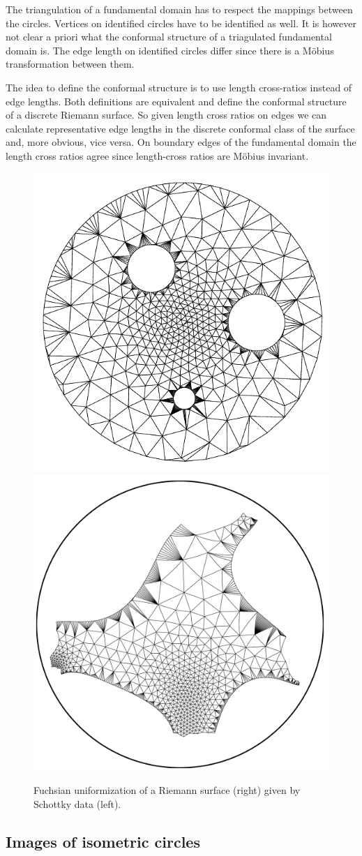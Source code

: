 The triangulation of a fundamental domain has to respect the mappings between the circles. Vertices on identified 
circles have to be identified as well. It is however not clear a priori what the conformal structure of a triagulated 
fundamental domain is. The edge length on identified circles differ since there is a M{\" o}bius transformation 
between them. 

The idea to define the conformal structure is to use length cross-ratios instead of edge lengths. Both definitions are equivalent and define the conformal structure of a discrete Riemann surface. So given length cross ratios on edges we can calculate representative edge lengths in the discrete conformal class of the surface and, more obvious, vice versa. On boundary edges of the fundamental domain the length cross ratios agree since length-cross ratios are M{\" o}bius invariant.

\begin{figure}
	\centering
	\includegraphics[width=0.4\linewidth]{image/schottky/schottky_domain2.pdf}
	\includegraphics[width=0.4\linewidth]{image/schottky/schottky01.pdf}
	\caption{Fuchsian uniformization of a Riemann surface (right) given by Schottky data (left).}
	\label{fig:fuchsian_to_schottky}
\end{figure}



\subsection{Images of isometric circles}
